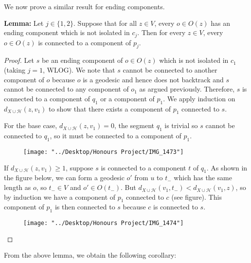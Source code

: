 \documentclass[12pt]{article}
\newcommand{\vs}{\vskip10pt}
\begin{document}
	We now prove a similar result for ending components. 
	
	\vs 
	
	\textbf{Lemma: } Let $j \in \{1,2\}$. Suppose that for all $z \in V$, every $o \in O(z)$ has an ending component which is not isolated in $c_j$. Then for every $z \in V$, every $o \in O(z)$ is connected to a component of $p_j$. 
	
	\begin{proof}
		
		Let $s$ be an ending component of $o \in O(z)$ which is not isolated in $c_1$ (taking $j = 1$, WLOG). We note that $s$ cannot be connected to another component of $o$ because $o$ is a geodesic and hence does not backtrack and $s$ cannot be connected to any component of $o_1$ as argued previously. Therefore, $s$ is connected to a component of $q_1$ or a component of $p_1$. We apply induction on $d_{X \cup \mathcal{H}} (z, v_1)$ to show that there exists a component of $p_1$ connected to $s$.
		
		\vs 
		
		For the base case, $d_{X \cup \mathcal{H}}(z, v_1) = 0$, the segment $q_1$ is trivial so $s$ cannot be connected to $q_1$, so it must be connected to a component of $p_1$. 
		
\begin{figure} [h]
	\centering
	\texttt{[image: "../Desktop/Honours Project/IMG\_1473"]}
	\caption{}
	\label{fig:img1473}
\end{figure}
		
		\vs 
		
		If $d_{X \cup \mathcal{H}}(z, v_1) \geq 1$, suppose $s$ is connected to a component $t$ of $q_1$. As shown in the figure below, we can form a geodesic $o'$ from $u$ to $t_-$ which has the same length as $o$, so $t_- \in V$ and $o' \in O(t_-)$. But $d_{X \cup \mathcal{H}}(v_1, t_-) < d_{X \cup \mathcal{H}}(v_1, z)$, so by induction we have a component of $p_1$ connected to $c$ (see figure). This component of $p_1$ is then connected to $s$ because $c$ is connected to $s$.
		
\begin{figure} [h]
	\centering
	\texttt{[image: "../Desktop/Honours Project/IMG\_1474"]}
	\caption{}
	\label{fig:img1474}
\end{figure}
		
	\end{proof}

	From the above lemma, we obtain the following corollary: 
	
\end{document}
